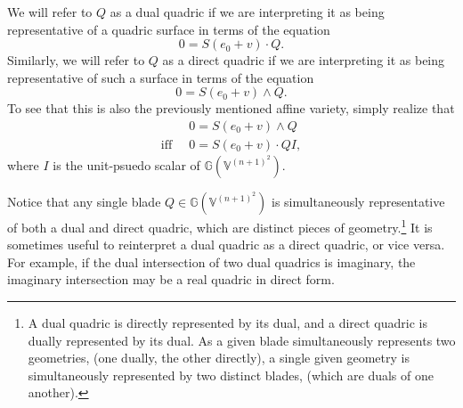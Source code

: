 \documentclass{birkjour}
\theoremstyle{definition}
\theoremstyle{remark}
\numberwithin{equation}{section}
\newcommand{\G}{\mathbb{G}}
\newcommand{\V}{\mathbb{V}}
\begin{document}
We will refer to $Q$ as a dual quadric if we are interpreting it as being representative
of a quadric surface in terms of the equation
\begin{equation}\label{equ_dual_quadric}
0 = S(e_0+v)\cdot Q.
\end{equation}
Similarly, we will refer to $Q$ as a direct quadric if we are interpreting it as being
representative of such a surface in terms of the equation
\begin{equation}\label{equ_direct_quadric}
0 = S(e_0+v)\wedge Q.
\end{equation}
To see that this is also the previously mentioned affine variety, simply realize that
\begin{align}
 & 0 = S(e_0+v)\wedge Q \\
\mbox{iff}\;\; & 0 = S(e_0+v)\cdot QI,
\end{align}
where $I$ is the unit-psuedo scalar of $\G(\V^{(n+1)^2})$.

Notice that any single blade $Q\in\G(\V^{(n+1)^2})$ is
simultaneously representative of both a dual and direct quadric, which are distinct
pieces of geometry.\footnote{A dual quadric is directly represented by its dual, and
a direct quadric is dually represented by its dual.  As a given blade simultaneously
represents two geometries, (one dually, the other directly), a single given geometry is
simultaneously represented by two distinct blades, (which are duals of one another).}
It is sometimes useful to reinterpret a dual quadric
as a direct quadric, or vice versa.  For example, if the dual intersection of
two dual quadrics is imaginary, the imaginary intersection may be a real quadric
in direct form.

\end{document}
